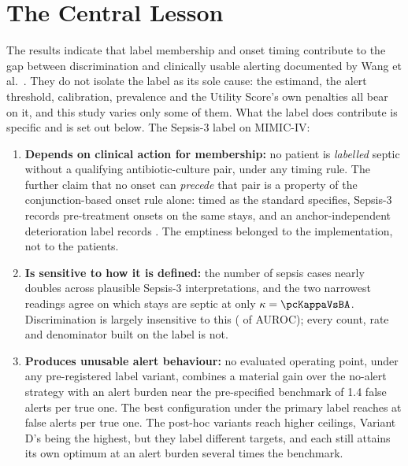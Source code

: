\section{The Central Lesson}

The results indicate that label membership and onset timing contribute to the
gap between discrimination and clinically usable alerting documented by Wang et
al.\ \cite{wang2025srpm}. They do not isolate the label as its sole cause:
the estimand, the alert threshold, calibration, prevalence and the Utility
Score's own penalties all bear on it, and this study varies only some of them.
What the label does contribute is specific and is set out below. The Sepsis-3
label on MIMIC-IV:

\begin{enumerate}
    \item \textbf{Depends on clinical action for membership:} no patient is
    \emph{labelled} septic without a qualifying antibiotic-culture pair, under
    any timing rule. The further claim that no onset can \emph{precede} that
    pair is a property of the conjunction-based onset rule alone: timed as the
    standard specifies, Sepsis-3 records \pcPreTreatOnsetsVarF{} pre-treatment
    onsets on the same stays, and an anchor-independent deterioration label
    records \pcPreTreatOnsetsVarD{}. The emptiness belonged to the
    implementation, not to the patients.
    \item \textbf{Is sensitive to how it is defined:} the number of sepsis
    cases nearly doubles across plausible Sepsis-3 interpretations, and the two
    narrowest readings agree on which stays are septic at only
    $\kappa = \pcKappaVsBA$. Discrimination is largely insensitive to this
    (\pcSpreadLabel{} of AUROC); every count, rate and denominator built on the
    label is not.
    \item \textbf{Produces unusable alert behaviour:} no evaluated operating
    point, under any pre-registered label variant, combines a material gain
    over the no-alert strategy with an alert burden near the pre-specified
    benchmark of 1.4 false alerts per true one. The best configuration under the primary label
    reaches \pcUtilityMaxGbtB{} at \pcUtilityOptBurdenGbtB{} false alerts per
    true one. The post-hoc variants reach higher ceilings, Variant D's being
    the highest, but they label different targets, and each still attains its
    own optimum at an alert burden several times the benchmark.
\end{enumerate}

